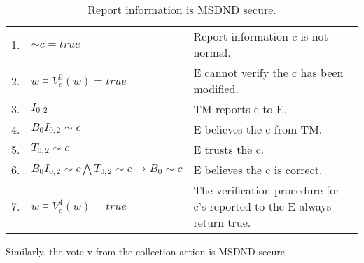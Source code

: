 \documentclass[journal,onecolumn]{IEEEtran}
\begin{document}
\begin{enumerate}
\begin{enumerate}
      \begin{table}[H]
        \caption{Report information is MSDND secure.}
        \centering
        \begin{tabular}{lll}
        1.  & ${\sim} c = true$                                                       & Report information c is not normal.                                                       \\
        2.  & $w \vDash V^0_c(w) = true$                                              & E cannot verify the c has been modified.                                 \\
        3.  & $I_{0,2}$                                                              & TM reports c to E.                                                \\
        4.  & $B_0I_{0,2} {\sim} c$                                                   & E believes the c from TM.                                     \\
        5.  & $T_{0,2} {\sim} c$                                                      & E trusts the c.                                                          \\
        6.  & $B_0I_{0,2} {\sim} c \bigwedge T_{0,2} {\sim} c \rightarrow B_0 {\sim} c$ & E believes the c is correct.                                             \\
        7. & $w \vDash V^4_c(w) = true$                                                & The verification procedure for c's reported to the E always return true.
        \end{tabular}
      \end{table}

      Similarly, the vote v from the collection action is MSDND secure. 


\end{enumerate}
\end{enumerate}
\end{document}
